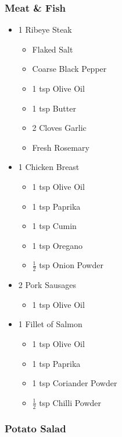 \documentclass[11pt, english]{article}
\begin{document}
		\subsubsection*{Meat \& Fish}

	\begin{itemize}
        \setlength\itemsep{0cm}
                \item 1 Ribeye Steak
		\begin{itemize}
			\item Flaked Salt
			\item Coarse Black Pepper
			\item 1 tsp Olive Oil
			\item 1 tsp Butter
			\item 2 Cloves Garlic
			\item Fresh Rosemary
		\end{itemize}
		\item 1 Chicken Breast
		\begin{itemize}
			\item 1 tsp Olive Oil
			\item 1 tsp Paprika
			\item 1 tsp Cumin
			\item 1 tsp Oregano
			\item $\frac{1}{2}$ tsp Onion Powder 
		\end{itemize}
		\item 2 Pork Sausages
		\begin{itemize}
			\item 1 tsp Olive Oil
		\end{itemize}
		\item 1 Fillet of Salmon
		\begin{itemize}
			\item 1 tsp Olive Oil
			\item 1 tsp Paprika
			\item 1 tsp Coriander Powder
			\item $\frac{1}{2}$ tsp Chilli Powder
		\end{itemize}
        \end{itemize}

		\subsubsection*{Potato Salad}
\end{document}
